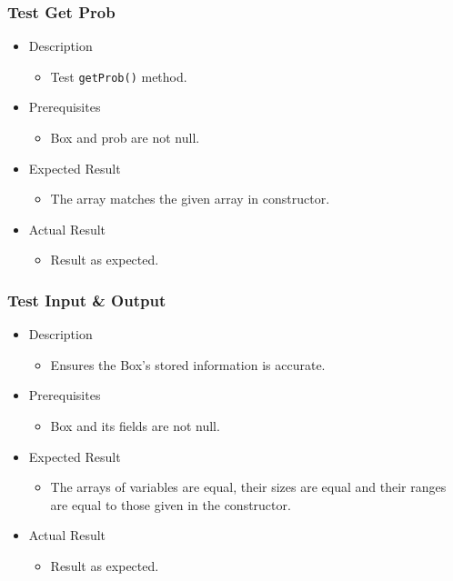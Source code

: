\documentclass[report.tex]{subfiles}
\begin{document}
\subsubsection{Test Get Prob} %
\label{ssub:test_get_prob}
\begin{itemize}
    \item Description
    \begin{itemize}
        \item Test \texttt{getProb()} method.
    \end{itemize}
    \item Prerequisites
    \begin{itemize}
        \item Box and prob are not null.
    \end{itemize}
    \item Expected Result
    \begin{itemize}
        \item The array matches the given array in constructor.
    \end{itemize}
    \item Actual Result
    \begin{itemize}
        \item Result as expected.
    \end{itemize}
\end{itemize}

\subsubsection{Test Input & Output} %
\label{ssub:test_input_output}
\begin{itemize}
    \item Description
    \begin{itemize}
        \item Ensures the Box's stored information is accurate.
    \end{itemize}
    \item Prerequisites
    \begin{itemize}
        \item Box and its fields are not null.
    \end{itemize}
    \item Expected Result
    \begin{itemize}
        \item The arrays of variables are equal, their sizes are equal and their
        ranges are equal to those given in the constructor.
    \end{itemize}
    \item Actual Result
    \begin{itemize}
        \item Result as expected.
    \end{itemize}
\end{itemize}
\end{document}
